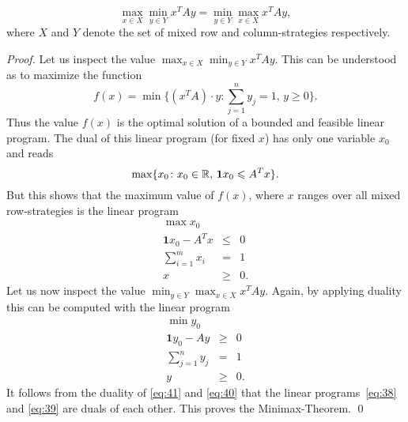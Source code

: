 \begin{theorem}
  \label{d:thr:7}
  \begin{displaymath}
   \max_{x \in X} \min_{y\in Y} x^TA y = \min_{y\in Y} \max_{x\in X}
   x^TAy,       
  \end{displaymath}
  where $X$ and $Y$ denote the set of mixed row and column-strategies
  respectively. 
\end{theorem}
\begin{proof}
  Let us inspect the value $\max_{x \in X} \min_{y\in Y} x^TA y $. This
  can be understood as to maximize the function 
  \begin{displaymath}
    f(x) = \min\{(x^TA) \cdot y \colon \sum_{j=1}^n y_j = 1, \, y\geq0\} . 
  \end{displaymath}
  Thus the value $f(x)$ is the optimal solution of a bounded and
  feasible linear program. The dual of this linear program (for fixed
  $x$) has only one variable $x_0$ and reads 
  \begin{displaymath}
    \max\{ x_0 \colon  x_0 \in \mathbb{R}, \,  \mathbf{1} x_0 \leqslant A^T x\}. 
  \end{displaymath}
  But this shows that the maximum value of $f(x)$, where $x$ ranges
  over all mixed row-strategies is the linear program 
  \begin{equation}
    \label{eq:38}
    \begin{array}{rcl}
      \max x_0 \\
      \mathbf{1} x_0 - A^Tx &\leq&0 \\
      \sum_{i=1}^m x_i & = & 1 \\
      x & \geq & 0.
    \end{array}
  \end{equation}
  Let us now inspect the value $\min_{y \in Y} \max_{x\in X} x^TA y
  $. Again, by applying duality this can be computed with the linear
  program 
  \begin{equation}
    \label{eq:39}
    \begin{array}{rcl}
      \min y_0 \\
      \mathbf{1} y_0 - Ay &\geq&0 \\
      \sum_{j=1}^n y_j & = & 1 \\
      y & \geq & 0.
    \end{array}
  \end{equation} 
It follows from the duality of \eqref{eq:41} and \eqref{eq:40} that
the linear programs~\eqref{eq:38} and 
\eqref{eq:39} are duals of each other. This proves the
Minimax-Theorem. \qed 



\end{proof}



